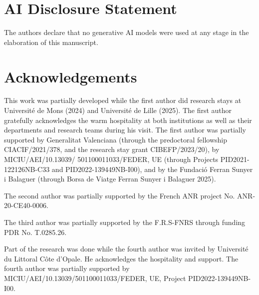 \documentclass[12pt,english]{amsart}
\numberwithin{equation}{section}
\theoremstyle{plain}
\theoremstyle{definition}
\begin{document}
\section*{AI Disclosure Statement}
The authors declare that no generative AI models were used at any stage in the elaboration of this manuscript.


\section*{Acknowledgements}
This work was partially developed while the first author did research stays at Université de Mons (2024) and Université de Lille (2025). The first author gratefully acknowledges the warm hospitality at both institutions as well as their departments and research teams during his visit. The first author was partially supported by Generalitat Valenciana (through the predoctoral fellowship CIACIF/2021/378, and the research stay grant CIBEFP/2023/20), by MICIU/AEI/10.13039/
501100011033/FEDER, UE (through Projects PID2021-122126NB-C33 and  PID2022-139449NB-I00), and by the Fundació Ferran Sunyer i Balaguer (through Borsa de Viatge Ferran Sunyer i Balaguer 2025). 


The second author was partially supported by the French ANR project No. ANR-20-CE40-0006.

The third author was partially supported by the F.R.S-FNRS through funding PDR No. T.0285.26.

Part of the research was done while the fourth author was invited by Université du Littoral Côte d’Opale. He acknowledges the hospitality and support. The fourth author was partially supported by MICIU/AEI/10.13039/501100011033/FEDER, UE, Project  PID2022-139449NB-I00. 



\printbibliography
\end{document}
